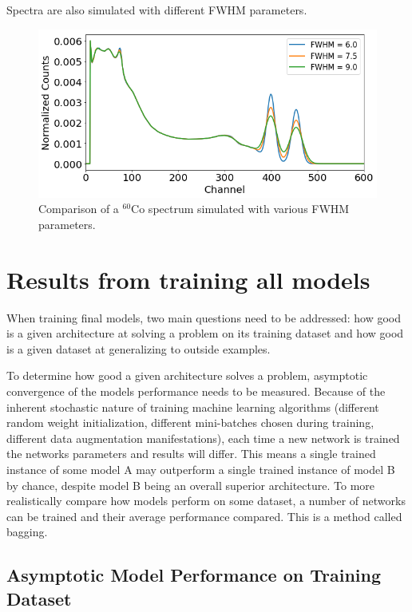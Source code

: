 Spectra are also simulated with different FWHM parameters.


\begin{figure}[H]
\centering
\includegraphics[width=0.95\linewidth]{images/sim_spectra_FWHM_comparison}
\caption{Comparison of a $^{60}$Co spectrum simulated with various FWHM parameters.}
\label{fig:sim_spectra_FWHM_comparison}
\end{figure}

\section{Results from training all models}

When training final models, two main questions need to be addressed: how good is a given architecture at solving a problem on its training dataset and how good is a given dataset at generalizing to outside examples.

To determine how good a given architecture solves a problem, asymptotic convergence of the models performance needs to be measured. Because of the inherent stochastic nature of training machine learning algorithms (different random weight initialization, different mini-batches chosen during training, different data augmentation manifestations), each time a new network is trained the networks parameters and results will differ. This means a single trained instance of some model A may outperform a single trained instance of model B by chance, despite model B being an overall superior architecture. To more realistically compare how models perform on some dataset, a number of networks can be trained and their average performance compared. This is a method called bagging.

\subsection{Asymptotic Model Performance on Training Dataset}

